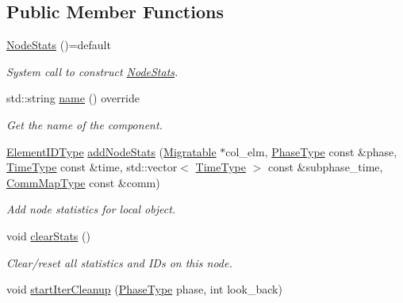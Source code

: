 \subsection*{Public Member Functions}
\begin{DoxyCompactItemize}
\item 
\hyperlink{structvt_1_1vrt_1_1collection_1_1balance_1_1_node_stats_a05936543d7f0f41a55c77fe5265ca8ed}{Node\+Stats} ()=default
\begin{DoxyCompactList}\small\item\em System call to construct {\ttfamily \hyperlink{structvt_1_1vrt_1_1collection_1_1balance_1_1_node_stats}{Node\+Stats}}. \end{DoxyCompactList}\item 
std\+::string \hyperlink{structvt_1_1vrt_1_1collection_1_1balance_1_1_node_stats_adfd9b278e017ccc02ed418c8f46bea2c}{name} () override
\begin{DoxyCompactList}\small\item\em Get the name of the component. \end{DoxyCompactList}\item 
\hyperlink{namespacevt_1_1vrt_1_1collection_1_1balance_a14c8d2c972f2913aa3f1636e5be0a120}{Element\+I\+D\+Type} \hyperlink{structvt_1_1vrt_1_1collection_1_1balance_1_1_node_stats_ae4d6db216e4c26de96a367499373a0a5}{add\+Node\+Stats} (\hyperlink{structvt_1_1vrt_1_1collection_1_1_migratable}{Migratable} $\ast$col\+\_\+elm, \hyperlink{namespacevt_a46ce6733d5cdbd735d561b7b4029f6d7}{Phase\+Type} const \&phase, \hyperlink{namespacevt_a876a9d0cd5a952859c72de8a46881442}{Time\+Type} const \&time, std\+::vector$<$ \hyperlink{namespacevt_a876a9d0cd5a952859c72de8a46881442}{Time\+Type} $>$ const \&subphase\+\_\+time, \hyperlink{namespacevt_1_1vrt_1_1collection_1_1balance_a10860c956804d644db54a16012352728}{Comm\+Map\+Type} const \&comm)
\begin{DoxyCompactList}\small\item\em Add node statistics for local object. \end{DoxyCompactList}\item 
void \hyperlink{structvt_1_1vrt_1_1collection_1_1balance_1_1_node_stats_a99adbf5c5165b274dd5abd761ed72c45}{clear\+Stats} ()
\begin{DoxyCompactList}\small\item\em Clear/reset all statistics and I\+Ds on this node. \end{DoxyCompactList}\item 
void \hyperlink{structvt_1_1vrt_1_1collection_1_1balance_1_1_node_stats_a733842a0c3cfcf96ba801fdd24866433}{start\+Iter\+Cleanup} (\hyperlink{namespacevt_a46ce6733d5cdbd735d561b7b4029f6d7}{Phase\+Type} phase, int look\+\_\+back)

\end{DoxyCompactItemize}
